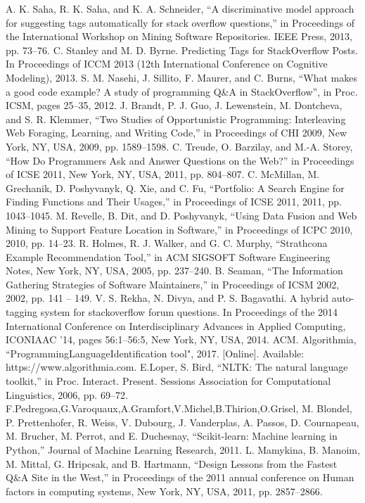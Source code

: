 \documentclass[letterpaper, 10 pt, conference]{ieeeconf}  %
\begin{document}
\begin{thebibliography}{99}%
\medbreak
{} A. K. Saha, R. K. Saha, and K. A. Schneider, “A discriminative model approach for suggesting tags automatically for stack overflow questions,” in Proceedings of the International Workshop on Mining Software Repositories. IEEE Press, 2013, pp. 73–76.
\medbreak
{} C. Stanley and M. D. Byrne. Predicting Tags for StackOverflow Posts. In
Proceedings of ICCM 2013 (12th International Conference on Cognitive Modeling), 2013.
\medbreak
{} S. M. Nasehi, J. Sillito, F. Maurer, and C. Burns, “What makes a good code example? A study of programming Q\&A in StackOverflow”, in Proc. ICSM, pages 25–35, 2012.
\medbreak
{} J. Brandt, P. J. Guo, J. Lewenstein, M. Dontcheva, and S. R. Klemmer, “Two Studies of Opportunistic Programming: Interleaving Web Foraging, Learning, and Writing Code,” in Proceedings of CHI 2009, New York, NY, USA, 2009, pp. 1589–1598.
\medbreak
{} C. Treude, O. Barzilay, and M.-A. Storey, “How Do Programmers Ask and Answer Questions on the Web?” in Proceedings of ICSE 2011, New York, NY, USA, 2011, pp. 804–807.
\medbreak
{}C. McMillan, M. Grechanik, D. Poshyvanyk, Q. Xie, and C. Fu, “Portfolio: A Search Engine for Finding Functions and Their Usages,” in Proceedings of ICSE 2011, 2011, pp. 1043–1045.
\medbreak
{}M. Revelle, B. Dit, and D. Poshyvanyk, “Using Data Fusion and Web Mining to Support Feature Location in Software,” in Proceedings of ICPC 2010, 2010, pp. 14–23.
\medbreak
{} R. Holmes, R. J. Walker, and G. C. Murphy, “Strathcona Example Recommendation Tool,” in ACM SIGSOFT Software Engineering Notes, New York, NY, USA, 2005, pp. 237–240.
\medbreak
{} B. Seaman, “The Information Gathering Strategies of Software Maintainers,” in Proceedings of ICSM 2002, 2002, pp. 141 – 149.
\medbreak
{}V. S. Rekha, N. Divya, and P. S. Bagavathi. A hybrid auto-tagging system for stackoverflow forum questions. In Proceedings of the 2014 International Conference on Interdisciplinary Advances in Applied Computing, ICONIAAC ’14, pages 56:1–56:5, New York, NY, USA, 2014. ACM.
\medbreak
{} Algorithmia, “ProgrammingLanguageIdentification tool", 2017. [Online]. Available: https://www.algorithmia.com.
\medbreak
{}E.Loper, S. Bird, “NLTK: The natural language toolkit,” in Proc. Interact. Present. Sessions Association for Computational Linguistics, 2006, pp. 69–72.
\medbreak
{}F.Pedregosa,G.Varoquaux,A.Gramfort,V.Michel,B.Thirion,O.Grisel, M. Blondel, P. Prettenhofer, R. Weiss, V. Dubourg, J. Vanderplas, A. Passos, D. Cournapeau, M. Brucher, M. Perrot, and E. Duchesnay, “Scikit-learn: Machine learning in Python,” Journal of Machine Learning
Research, 2011.
\medbreak
{}L. Mamykina, B. Manoim, M. Mittal, G. Hripcsak, and B. Hartmann, “Design Lessons from the Fastest Q\&A Site in the West,” in Proceedings of the 2011 annual conference on Human factors in computing systems, New York, NY, USA, 2011, pp. 2857–2866.


\end{thebibliography}
\end{document}
